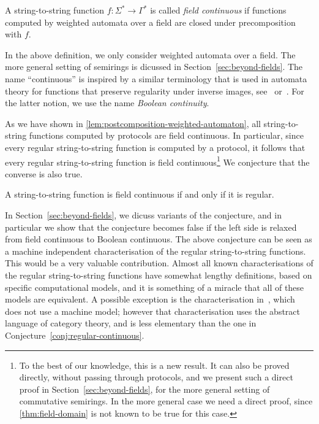 \begin{definition}
    \label{def:weighted-continuity}
    A string-to-string function $f : \Sigma^* \to \Gamma^*$ is called \emph{field continuous} if functions computed by weighted automata over a field are closed under precomposition with $f$.
\end{definition}

In the above definition, we only consider weighted automata over a field. The more general setting of semirings is dicussed in Section~\ref{sec:beyond-fields}.
The name ``continuous'' is inspired by a similar terminology that is used in automata theory for functions that preserve regularity under inverse images, see~\cite[Theorem 4.1]{PinSilva05} or~\cite[Footnote 2]{continuity20}.  For the latter notion, we use the name \emph{Boolean continuity}.

As we have shown in \cref{lem:postcomposition-weighted-automaton}, all string-to-string functions computed by protocols are field continuous. In particular, since every regular string-to-string function is computed by a protocol, it follows that every regular string-to-string function is field continuous\footnote{To the best of our knowledge, this is a new result. It can also be proved directly, without passing through protocols, and we present such a direct proof in Section~\ref{sec:beyond-fields}, for the more general setting of commutative semirings. In the more general case we need a direct proof, since \cref{thm:field-domain} is not known to be true for this case.}
We conjecture that the converse is also true.

\begin{conjecture}\label{conj:regular-continuous}
    A string-to-string function is field continuous if and only if it is regular.
\end{conjecture}

In Section~\ref{sec:beyond-fields}, we dicuss variants of the conjecture, and in particular we show that the conjecture becomes false if the left side is relaxed from field continuous to Boolean continuous.
The above conjecture can be seen as  a machine independent characterisation of the regular string-to-string  functions. This would be a very valuable contribution. Almost all known characterisations of the regular string-to-string  functions have somewhat lengthy definitions, based on specific computational models, and it is something of a  miracle that all of these models are equivalent. A possible exception is the characterisation in~\cite{bojanczykTitoRegular23}, which does not use a machine model; however that characterisation uses the abstract language of category theory, and is less elementary than the one in Conjecture~\ref{conj:regular-continuous}.

